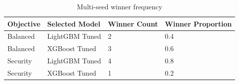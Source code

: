 \begin{table}[htbp]
\centering
\caption{Multi-seed winner frequency}
\begin{tabular}{llll}
\hline
Objective & Selected Model & Winner Count & Winner Proportion \\
\hline
Balanced & LightGBM Tuned & 2 & 0.4 \\
Balanced & XGBoost Tuned & 3 & 0.6 \\
Security & LightGBM Tuned & 4 & 0.8 \\
Security & XGBoost Tuned & 1 & 0.2 \\
\hline
\end{tabular}
\end{table}
